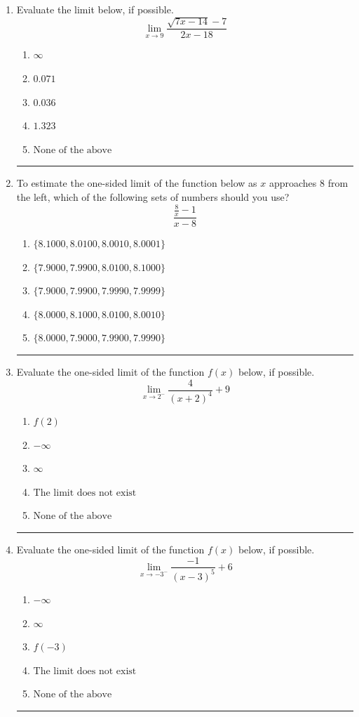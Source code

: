 \documentclass[14pt]{extbook}
\newcommand{\litem}[1]{\item#1\hspace*{-1cm}\rule{\textwidth}{0.4pt}}
\begin{document}
\begin{enumerate}
\litem{
Evaluate the limit below, if possible.\[ \lim_{x \rightarrow 9} \frac{\sqrt{7x - 14} - 7}{2x - 18} \]\begin{enumerate}[label=\Alph*.]
\item \( \infty \)
\item \( 0.071 \)
\item \( 0.036 \)
\item \( 1.323 \)
\item \( \text{None of the above} \)

\end{enumerate} }
\litem{
To estimate the one-sided limit of the function below as $x$ approaches 8 from the left, which of the following sets of numbers should you use?\[ \frac{\frac{8}{x} - 1}{x - 8} \]\begin{enumerate}[label=\Alph*.]
\item \( \{ 8.1000, 8.0100, 8.0010, 8.0001 \} \)
\item \( \{ 7.9000, 7.9900, 8.0100, 8.1000 \} \)
\item \( \{ 7.9000, 7.9900, 7.9990, 7.9999 \} \)
\item \( \{ 8.0000, 8.1000, 8.0100, 8.0010 \} \)
\item \( \{ 8.0000, 7.9000, 7.9900, 7.9990 \} \)

\end{enumerate} }
\litem{
Evaluate the one-sided limit of the function $f(x)$ below, if possible.\[ \lim_{x \rightarrow 2^-} \frac{4}{(x+2)^4}+9 \]\begin{enumerate}[label=\Alph*.]
\item \( f(2) \)
\item \( -\infty \)
\item \( \infty \)
\item \( \text{The limit does not exist} \)
\item \( \text{None of the above} \)

\end{enumerate} }
\litem{
Evaluate the one-sided limit of the function $f(x)$ below, if possible.\[ \lim_{x \rightarrow -3^-} \frac{-1}{(x-3)^5}+6 \]\begin{enumerate}[label=\Alph*.]
\item \( -\infty \)
\item \( \infty \)
\item \( f(-3) \)
\item \( \text{The limit does not exist} \)
\item \( \text{None of the above} \)


\end{enumerate}}
\end{enumerate}
\end{document}
